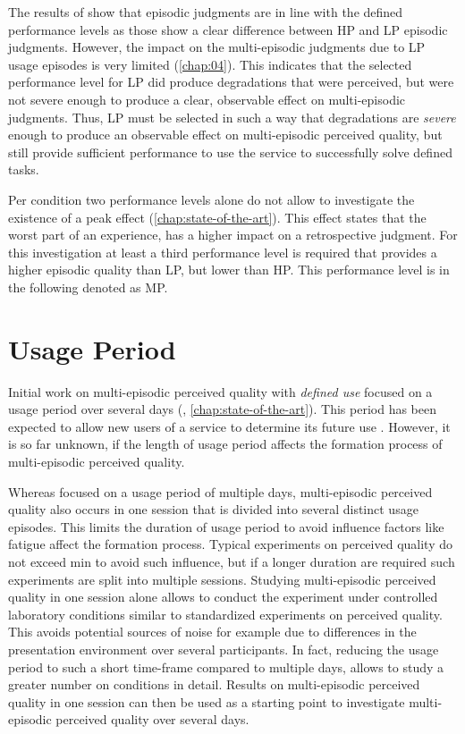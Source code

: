 The results of \cite{moller_single-call_2011} show that episodic judgments are in line with the defined performance levels as those show a clear difference between \ac{HP} and \ac{LP} episodic judgments.
However, the impact on the multi-episodic judgments due to \ac{LP} usage episodes is very limited (\cf \autoref{chap:04}).
This indicates that the selected performance level for \ac{LP} did produce degradations that were perceived, but were not severe enough to produce a clear, observable effect on multi-episodic judgments.
Thus, \ac{LP} must be selected in such a way that degradations are \emph{severe} enough to produce an observable effect on multi-episodic perceived quality, but still provide sufficient performance to use the service to successfully solve defined tasks.

Per condition two performance levels alone do not allow to investigate the existence of a peak effect (\cf \autoref{chap:state-of-the-art}).
This effect states that the worst part of an experience, has a higher impact on a retrospective judgment.
For this investigation at least a third performance level is required that provides a higher episodic quality than \ac{LP}, but lower than \ac{HP}.
This performance level is in the following denoted as \acf{MP}.

\section{Usage Period}
Initial work on multi-episodic perceived quality with \emph{defined use} focused on a usage period over several days (\cf, \autoref{chap:state-of-the-art}). 
This period has been expected to allow new users of a service to determine its future use \citep[\cf,][]{moller_single-call_2011}.
However, it is so far unknown, if the length of usage period affects the formation process of multi-episodic perceived quality.

Whereas \cite{moller_single-call_2011} focused on a usage period of multiple days, multi-episodic perceived quality also occurs in one session that is divided into several distinct usage episodes.
This limits the duration of usage period to avoid influence factors like fatigue affect the formation process.
Typical experiments on perceived quality do not exceed \unit[90]{min} to avoid such influence, but if a longer duration are required such experiments are split into multiple sessions.
Studying multi-episodic perceived quality in one session alone allows to conduct the experiment under controlled laboratory conditions similar to standardized experiments on perceived quality.
This avoids potential sources of noise for example due to differences in the presentation environment over several participants.
In fact, reducing the usage period to such a short time-frame compared to multiple days, allows to study a greater number on conditions in detail.
Results on multi-episodic perceived quality in one session can then be used as a starting point to investigate multi-episodic perceived quality over several days.

